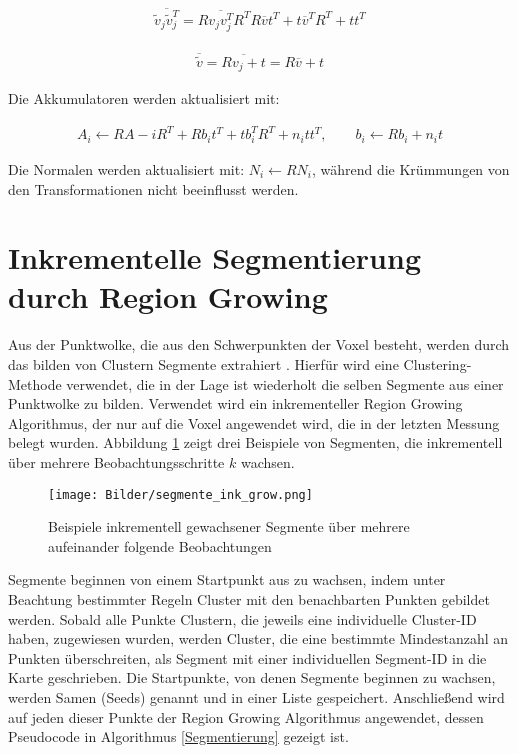 \begin{align}
	\overline{\widetilde{v}_j \widetilde{v}_j^T} = R\overline{v_jv_j^T}R^T  R\overline{v}t^T  + t\overline{v}^TR^T + tt^T
\end{align}

\begin{align}
		\overline{\widetilde{v}} = \overline{Rv_j+t} = R\overline{v}+t
\end{align}

Die Akkumulatoren werden  aktualisiert mit: 

\begin{align}
	A_i \leftarrow RA-iR^T+Rb_it^T+tb_i^TR^T+n_itt^T,  \qquad b_i \leftarrow Rb_i+n_it
\end{align}
 
Die Normalen werden aktualisiert mit: $ N_i \leftarrow RN_i $, während die Krümmungen von den Transformationen nicht beeinflusst werden. 
 
\section[Inkrementelle Segmentierung durch Region Growing (Schmelzer)]{Inkrementelle Segmentierung durch Region Growing}
\label{sec:Segmentierung}

Aus der Punktwolke, die aus den Schwerpunkten der Voxel besteht, werden durch das bilden von Clustern Segmente extrahiert \cite{Dube2018}. Hierfür wird eine Clustering-Methode verwendet, die in der Lage ist wiederholt die selben Segmente aus einer Punktwolke zu bilden. Verwendet wird ein inkrementeller Region Growing Algorithmus, der nur auf die Voxel angewendet wird, die in der letzten Messung belegt wurden. Abbildung \ref{fig:bsp_segmentierung} zeigt drei Beispiele von Segmenten, die inkrementell über mehrere Beobachtungsschritte $ k $ wachsen.

\begin{figure}
    \centering
    \texttt{[image: Bilder/segmente\_ink\_grow.png]}
    \caption{Beispiele inkrementell gewachsener Segmente über mehrere aufeinander folgende Beobachtungen \cite{Dube2018}}
    \label{fig:bsp_segmentierung}
\end{figure}

Segmente beginnen von einem Startpunkt aus zu wachsen, indem unter Beachtung bestimmter Regeln Cluster mit den benachbarten Punkten gebildet werden. Sobald alle Punkte Clustern, die jeweils eine individuelle Cluster-ID haben, zugewiesen wurden, werden Cluster, die eine bestimmte Mindestanzahl an Punkten überschreiten, als Segment mit einer individuellen Segment-ID in die Karte geschrieben. Die Startpunkte, von denen Segmente beginnen zu wachsen, werden Samen (Seeds) genannt und in einer Liste gespeichert. Anschließend wird auf jeden dieser Punkte der Region Growing Algorithmus angewendet, dessen Pseudocode in Algorithmus \ref{Segmentierung} gezeigt ist. 
  
